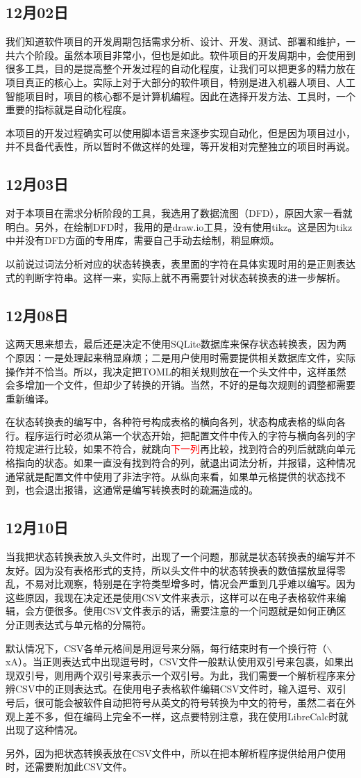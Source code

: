 \subsection{12月02日}
我们知道软件项目的开发周期包括需求分析、设计、开发、测试、部署和维护，一共六个阶段。虽然本项目非常小，但也是如此。软件项目的开发周期中，会使用到很多工具，目的是提高整个开发过程的自动化程度，让我们可以把更多的精力放在项目真正的核心上。实际上对于大部分的软件项目，特别是进入机器人项目、人工智能项目时，项目的核心都不是计算机编程。因此在选择开发方法、工具时，一个重要的指标就是自动化程度。

本项目的开发过程确实可以使用脚本语言来逐步实现自动化，但是因为项目过小，并不具备代表性，所以暂时不做这样的处理，等开发相对完整独立的项目时再说。


\subsection{12月03日}
对于本项目在需求分析阶段的工具，我选用了数据流图（DFD），原因大家一看就明白。另外，在绘制DFD时，我用的是draw.io工具，没有使用tikz。这是因为tikz中并没有DFD方面的专用库，需要自己手动去绘制，稍显麻烦。

以前说过词法分析对应的状态转换表，表里面的字符在具体实现时用的是正则表达式的判断字符串。这样一来，实际上就不再需要针对状态转换表的进一步解析。


\subsection{12月08日}
这两天思来想去，最后还是决定不使用SQLite数据库来保存状态转换表，因为两个原因：一是处理起来稍显麻烦；二是用户使用时需要提供相关数据库文件，实际操作并不恰当。所以，我决定把TOML的相关规则放在一个头文件中，这样虽然会多增加一个文件，但却少了转换的开销。当然，不好的是每次规则的调整都需要重新编译。

在状态转换表的编写中，各种符号构成表格的横向各列，状态构成表格的纵向各行。程序运行时必须从第一个状态开始，把配置文件中传入的字符与横向各列的字符规定进行比较，如果不符合，就跳向\textcolor{red}{下一列}再比较，找到符合的列后就跳向单元格指向的状态。如果一直没有找到符合的列，就退出词法分析，并报错，这种情况通常就是配置文件中使用了非法字符。从纵向来看，如果单元格提供的状态找不到，也会退出报错，这通常是编写转换表时的疏漏造成的。


\subsection{12月10日}
当我把状态转换表放入头文件时，出现了一个问题，那就是状态转换表的编写并不友好。因为没有表格形式的支持，所以头文件中的状态转换表的数值摆放显得零乱，不易对比观察，特别是在字符类型增多时，情况会严重到几乎难以编写。因为这些原因，我现在决定还是使用CSV文件来表示，这样可以在电子表格软件来编辑，会方便很多。使用CSV文件表示的话，需要注意的一个问题就是如何正确区分正则表达式与单元格的分隔符。

默认情况下，CSV各单元格间是用逗号来分隔，每行结束时有一个换行符（$\backslash$xA）。当正则表达式中出现逗号时，CSV文件一般默认使用双引号来包裹，如果出现双引号，则用两个双引号来表示一个双引号。为此，我们需要一个解析程序来分辨CSV中的正则表达式。在使用电子表格软件编辑CSV文件时，输入逗号、双引号后，很可能会被软件自动把符号从英文的符号转换为中文的符号，虽然二者在外观上差不多，但在编码上完全不一样，这点要特别注意，我在使用LibreCalc时就出现了这种情况。

另外，因为把状态转换表放在CSV文件中，所以在把本解析程序提供给用户使用时，还需要附加此CSV文件。
